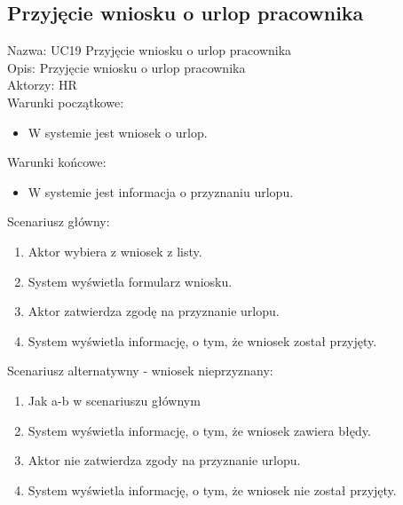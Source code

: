\subsection{Przyjęcie wniosku o urlop pracownika}
\begin{adjustwidth}{5em}{0pt}
Nazwa: UC19 Przyjęcie wniosku o urlop pracownika \\
Opis: Przyjęcie wniosku o urlop pracownika \\
Aktorzy: HR \\
Warunki początkowe:
\begin{itemize}
\item W systemie jest wniosek o urlop.
\end{itemize}
Warunki końcowe:
\begin{itemize}
\item W systemie jest informacja o przyznaniu urlopu.
\end{itemize}
Scenariusz główny:
\begin{enumerate}
\item Aktor wybiera z wniosek z listy.
\item System wyświetla formularz wniosku.
\item Aktor zatwierdza zgodę na przyznanie urlopu.
\item System wyświetla informację, o tym, że wniosek został przyjęty.
\end{enumerate}
Scenariusz alternatywny - wniosek nieprzyznany: 
\begin{enumerate}
\item Jak a-b w scenariuszu głównym
\item System wyświetla informację, o tym, że wniosek zawiera błędy.
\item Aktor nie zatwierdza zgody na przyznanie urlopu.
\item System wyświetla informację, o tym, że wniosek nie został przyjęty.
\end{enumerate}
\end{adjustwidth}

